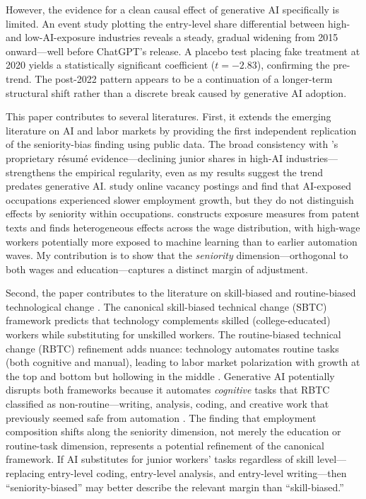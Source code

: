 \documentclass[12pt]{article}
\begin{document}
However, the evidence for a clean causal effect of generative AI specifically is limited. An event study plotting the entry-level share differential between high- and low-AI-exposure industries reveals a steady, gradual widening from 2015 onward---well before ChatGPT's release. A placebo test placing fake treatment at 2020 yields a statistically significant coefficient ($t = -2.83$), confirming the pre-trend. The post-2022 pattern appears to be a continuation of a longer-term structural shift rather than a discrete break caused by generative AI adoption.

This paper contributes to several literatures. First, it extends the emerging literature on AI and labor markets \citep{acemoglu2022, webb2020, eloundou2024} by providing the first independent replication of the seniority-bias finding using public data. The broad consistency with \citet{hosseini2025}'s proprietary r\'{e}sum\'{e} evidence---declining junior shares in high-AI industries---strengthens the empirical regularity, even as my results suggest the trend predates generative AI. \citet{acemoglu2022} study online vacancy postings and find that AI-exposed occupations experienced slower employment growth, but they do not distinguish effects by seniority within occupations. \citet{webb2020} constructs exposure measures from patent texts and finds heterogeneous effects across the wage distribution, with high-wage workers potentially more exposed to machine learning than to earlier automation waves. My contribution is to show that the \emph{seniority} dimension---orthogonal to both wages and education---captures a distinct margin of adjustment.

Second, the paper contributes to the literature on skill-biased and routine-biased technological change \citep{autor2003, autor2006, autor2013, card2002}. The canonical skill-biased technical change (SBTC) framework \citep{katz1992, goldin2007} predicts that technology complements skilled (college-educated) workers while substituting for unskilled workers. The routine-biased technical change (RBTC) refinement \citep{autor2003, autor2015} adds nuance: technology automates routine tasks (both cognitive and manual), leading to labor market polarization with growth at the top and bottom but hollowing in the middle \citep{autor2006, autor2013}. Generative AI potentially disrupts both frameworks because it automates \emph{cognitive} tasks that RBTC classified as non-routine---writing, analysis, coding, and creative work that previously seemed safe from automation \citep{eloundou2024}. The finding that employment composition shifts along the seniority dimension, not merely the education or routine-task dimension, represents a potential refinement of the canonical framework. If AI substitutes for junior workers' tasks regardless of skill level---replacing entry-level coding, entry-level analysis, and entry-level writing---then ``seniority-biased'' may better describe the relevant margin than ``skill-biased.''
\end{document}
